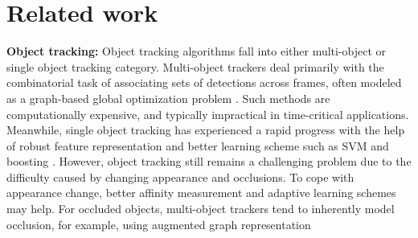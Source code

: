 \section{Related work}
\textbf{Object tracking:}
Object tracking algorithms fall into either multi-object or single object tracking category. Multi-object trackers deal primarily with the combinatorial task of associating sets of detections across frames, often modeled as a graph-based global optimization problem 
\cite{butt2013multi,berclaz2011multiple}.
Such methods are computationally expensive, and typically impractical in time-critical applications. Meanwhile, single object tracking has experienced a rapid progress with the help of robust feature representation \cite{kwon2010visual} %
and better learning scheme such as SVM \cite{hare2011struck} and boosting \cite{grabner2006real}. 
However, object tracking still remains a challenging problem due to the difficulty caused by changing appearance and occlusions. To cope with appearance change, better affinity measurement \cite{choi2015near} and adaptive learning schemes \cite{kalal2012tracking} may help.
For occluded objects, multi-object trackers tend to inherently model occlusion, for example, using augmented graph representation \cite{butt2013multi} %
